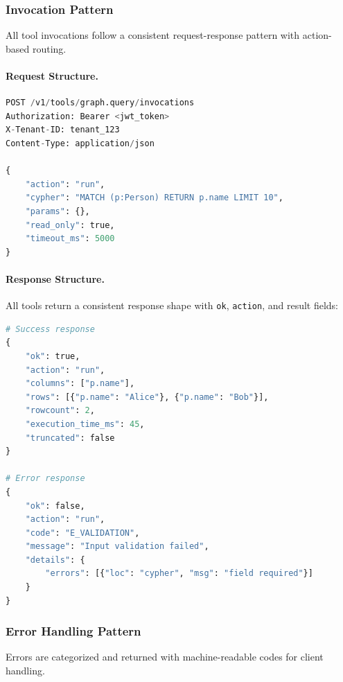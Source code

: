 \subsubsection{Invocation Pattern}

All tool invocations follow a consistent request-response pattern with action-based routing.

\paragraph{Request Structure.}
\begin{lstlisting}[language=Python, caption={Standard tool invocation request}, label={lst:tool-invocation-request}]
POST /v1/tools/graph.query/invocations
Authorization: Bearer <jwt_token>
X-Tenant-ID: tenant_123
Content-Type: application/json

{
    "action": "run",
    "cypher": "MATCH (p:Person) RETURN p.name LIMIT 10",
    "params": {},
    "read_only": true,
    "timeout_ms": 5000
}
\end{lstlisting}

\paragraph{Response Structure.}
All tools return a consistent response shape with \texttt{ok}, \texttt{action}, and result fields:

\begin{lstlisting}[language=Python, caption={Standard tool response shape}, label={lst:tool-response-shape}]
# Success response
{
    "ok": true,
    "action": "run",
    "columns": ["p.name"],
    "rows": [{"p.name": "Alice"}, {"p.name": "Bob"}],
    "rowcount": 2,
    "execution_time_ms": 45,
    "truncated": false
}

# Error response
{
    "ok": false,
    "action": "run",
    "code": "E_VALIDATION",
    "message": "Input validation failed",
    "details": {
        "errors": [{"loc": "cypher", "msg": "field required"}]
    }
}
\end{lstlisting}

\subsubsection{Error Handling Pattern}

Errors are categorized and returned with machine-readable codes for client handling.


